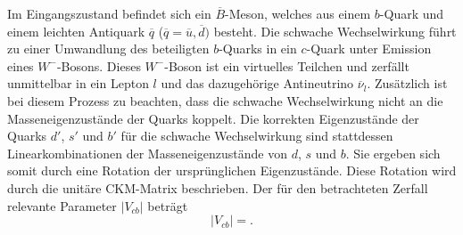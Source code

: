 Im Eingangszustand befindet sich ein $\overline B$-Meson, welches aus einem $b$-Quark und einem leichten Antiquark $\overline q$ ($ \overline q = \overline u, \overline d)$ besteht.
Die schwache Wechselwirkung führt zu einer Umwandlung des beteiligten $b$-Quarks in ein $c$-Quark unter Emission eines $W^{-}$-Bosons. Dieses $W^{-}$-Boson ist ein virtuelles Teilchen und zerfällt unmittelbar in ein Lepton $l$ und das dazugehörige Antineutrino $\overline \nu_l$.
Zusätzlich ist bei diesem Prozess zu beachten, dass die schwache Wechselwirkung nicht an die Masseneigenzustände der Quarks koppelt.
Die korrekten Eigenzustände der Quarks $d'$, $s'$ und $b'$ für die schwache Wechselwirkung sind stattdessen Linearkombinationen der Masseneigenzustände von $d$, $s$ und $b$.
Sie ergeben sich somit durch eine Rotation der ursprünglichen Eigenzustände.
Diese Rotation wird durch die unitäre CKM-Matrix beschrieben.
Der für den betrachteten Zerfall relevante Parameter $\lvert V_{cb} \rvert$ beträgt \cite{Bigi2017441}
\begin{equation}
  \lvert V_{cb} \rvert = .
\end{equation}

